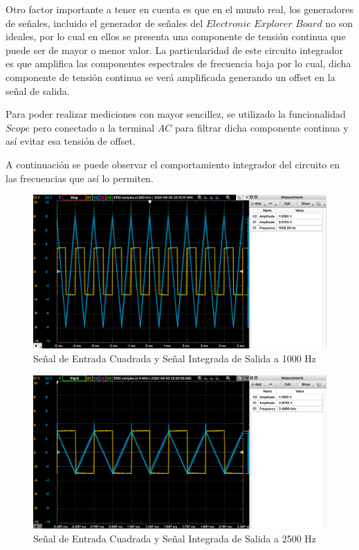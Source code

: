 Otro factor importante a tener en cuenta es que en el mundo real, los generadores de señales, incluido el generador de señales del $Electronic$ $Explorer$ $Board$ no son ideales,
por lo cual en ellos se presenta una componente de tensión continua que puede ser de mayor o menor valor. La particularidad de este circuito integrador es que amplifica las componentes 
espectrales de frecuencia baja por lo cual, dicha componente de tensión continua se verá amplificada generando un offset en la señal de salida.

Para poder realizar mediciones con mayor sencillez, se utilizado la funcionalidad $Scope$ pero conectado a la terminal $AC$ para filtrar dicha componente continua y así evitar
esa tensión de offset. 


A continuación se puede observar el comportamiento integrador del circuito en las frecuencias que así lo permiten.

\begin{figure}[H]
    \centering 
    \includegraphics [scale=1] {../Ejercicio3-CircuitoIntegradoresyDerivadores/Imagenes/cuadrada-1000.png} 
    \caption{Señal de Entrada Cuadrada y Señal Integrada de Salida a 1000 Hz }
    \label{fig:emptyPlotTool}
\end{figure}

\begin{figure}[H]
    \centering 
    \includegraphics [scale=1] {../Ejercicio3-CircuitoIntegradoresyDerivadores/Imagenes/cuadrada-2500.png} 
    \caption{Señal de Entrada Cuadrada y Señal Integrada de Salida a 2500 Hz}
    \label{fig:emptyPlotTool}
\end{figure}

